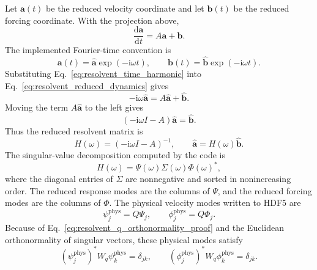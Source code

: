 \documentclass[11pt]{article}
\newcommand{\ii}{\mathrm{i}}
\newcommand{\dd}{\mathrm{d}}
\newcommand{\bfa}{\bm{a}}
\newcommand{\bfb}{\bm{b}}
\begin{document}
Let \(\bfa(t)\) be the reduced velocity coordinate and let \(\bfb(t)\) be the
reduced forcing coordinate. With the projection above,
\begin{equation}
  \frac{\dd \bfa}{\dd t}=A\bfa+\bfb.
  \label{eq:resolvent_reduced_dynamics}
\end{equation}
The implemented Fourier-time convention is
\begin{equation}
  \bfa(t)=\widehat{\bfa}\exp(-\ii\omega t),
  \qquad
  \bfb(t)=\widehat{\bfb}\exp(-\ii\omega t).
  \label{eq:resolvent_time_harmonic}
\end{equation}
Substituting Eq.~\eqref{eq:resolvent_time_harmonic} into
Eq.~\eqref{eq:resolvent_reduced_dynamics} gives
\begin{equation}
  -\ii\omega\widehat{\bfa}
  =
  A\widehat{\bfa}+\widehat{\bfb}.
  \label{eq:resolvent_harmonic_balance}
\end{equation}
Moving the term \(A\widehat{\bfa}\) to the left gives
\begin{equation}
  \left(-\ii\omega I-A\right)\widehat{\bfa}
  =
  \widehat{\bfb}.
  \label{eq:resolvent_shifted_system}
\end{equation}
Thus the reduced resolvent matrix is
\begin{equation}
  H(\omega)
  =
  \left(-\ii\omega I-A\right)^{-1},
  \qquad
  \widehat{\bfa}=H(\omega)\widehat{\bfb}.
  \label{eq:resolvent_h_definition}
\end{equation}
The singular-value decomposition computed by the code is
\begin{equation}
  H(\omega)=\Psi(\omega)\Sigma(\omega)\Phi(\omega)^*,
  \label{eq:resolvent_svd}
\end{equation}
where the diagonal entries of \(\Sigma\) are nonnegative and sorted in
nonincreasing order. The reduced response modes are the columns of
\(\Psi\), and the reduced forcing modes are the columns of \(\Phi\). The
physical velocity modes written to HDF5 are
\begin{equation}
  \psi_j^{\mathrm{phys}} = Q\Psi_j,
  \qquad
  \phi_j^{\mathrm{phys}} = Q\Phi_j.
  \label{eq:resolvent_physical_modes}
\end{equation}
Because of Eq.~\eqref{eq:resolvent_q_orthonormality_proof} and the Euclidean
orthonormality of singular vectors, these physical modes satisfy
\begin{equation}
  \left(\psi_j^{\mathrm{phys}}\right)^*W_q\psi_k^{\mathrm{phys}}
  =
  \delta_{jk},
  \qquad
  \left(\phi_j^{\mathrm{phys}}\right)^*W_q\phi_k^{\mathrm{phys}}
  =
  \delta_{jk}.
  \label{eq:resolvent_physical_mode_normalization}
\end{equation}
\end{document}
